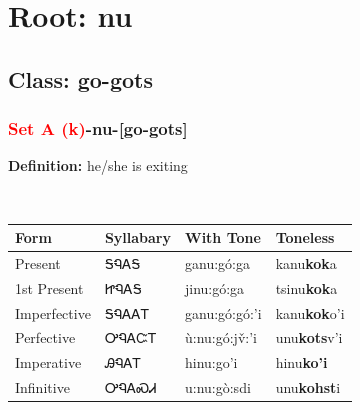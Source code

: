 \needspace{4in}
\section*{Root: nu}
\nopagebreak
{}
\needspace{3in}
\subsection*{Class: go-gots}
\nopagebreak
\needspace{2in}
\subsubsection*{\textcolor{Red}{Set A (k)}{-}\textbf{nu}{-}[go-gots]}
\nopagebreak
\textbf{Definition: } he/she is exiting
\\[0.5em]
\begin{tabularx}{\textwidth}{l X X X}%
\toprule%
\textbf{Form}&\textbf{Syllabary}&\textbf{With Tone}&\textbf{Toneless}\\%
\midrule%
Present&ᎦᏄᎪᎦ&ganu:gó:ga&kanu\textbf{kok}a\\%
1st Present&ᏥᏄᎪᎦ&jinu:gó:ga&tsinu\textbf{kok}a\\%
Imperfective&ᎦᏄᎪᎪᎢ&ganu:gó:gó:’i&kanu\textbf{kok}o'i\\%
Perfective&ᎤᏄᎪᏨᎢ&ù:nu:gó:jv̌:’i&unu\textbf{kots}v'i\\%
Imperative&ᎯᏄᎪᎢ&hinu:go’i&hinu\textbf{ko'i}\\%
Infinitive&ᎤᏄᎪᏍᏗ&u:nu:gò:sdi&unu\textbf{kohst}i\\%
\bottomrule%
\end{tabularx}
\\[1em]